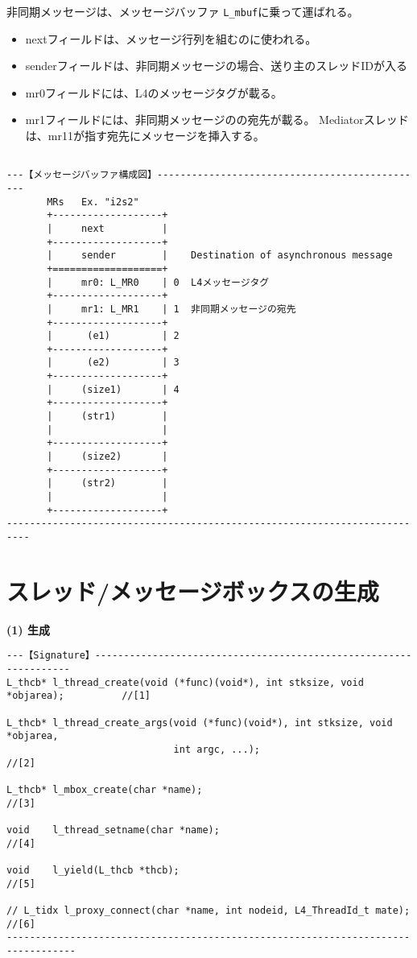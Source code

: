 非同期メッセージは、メッセージバッファ \verb|L_mbuf|に乗って運ばれる。
\begin{itemize}
\item  nextフィールドは、メッセージ行列を組むのに使われる。
\item  senderフィールドは、非同期メッセージの場合、送り主のスレッドIDが入る
\item  mr0フィールドには、L4のメッセージタグが載る。
\item   mr1フィールドには、非同期メッセージのの宛先が載る。
     Mediatorスレッドは、mr11が指す宛先にメッセージを挿入する。
\end{itemize}


{\small\begin{verbatim}

---【メッセージバッファ構成図】-----------------------------------------------
       MRs   Ex. "i2s2"
       +-------------------+
       |     next          | 
       +-------------------+
       |     sender        |    Destination of asynchronous message
       +===================+
       |     mr0: L_MR0    | 0  L4メッセージタグ
       +-------------------+
       |     mr1: L_MR1    | 1  非同期メッセージの宛先
       +-------------------+
       |      (e1)         | 2
       +-------------------+
       |      (e2)         | 3
       +-------------------+
       |     (size1)       | 4
       +-------------------+
       |     (str1)        |
       |                   |
       +-------------------+
       |     (size2)       |
       +-------------------+
       |     (str2)        |
       |                   |
       +-------------------+
--------------------------------------------------------------------------
\end{verbatim}}



\section{スレッド/メッセージボックスの生成}

{\flushleft\bf (1) 生成}

\begin{verbatim}
---【Signature】------------------------------------------------------------------
L_thcb* l_thread_create(void (*func)(void*), int stksize, void *objarea);          //[1]

L_thcb* l_thread_create_args(void (*func)(void*), int stksize, void *objarea, 
                             int argc, ...);                                      //[2]

L_thcb* l_mbox_create(char *name);                                           //[3]

void    l_thread_setname(char *name);                                        //[4]

void    l_yield(L_thcb *thcb);                                               //[5]

// L_tidx l_proxy_connect(char *name, int nodeid, L4_ThreadId_t mate);       //[6]
----------------------------------------------------------------------------------
\end{verbatim}

